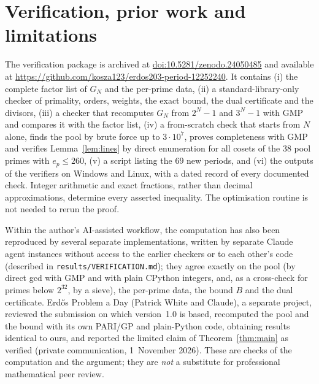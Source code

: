 \documentclass[11pt,a4paper]{article}
\begin{document}
\section{Verification, prior work and limitations}\label{sec:verif}
The verification package is archived at \href{https://doi.org/10.5281/zenodo.24050485}{doi:10.5281/zenodo.24050485} and available at \url{https://github.com/kosza123/erdos203-period-12252240}. It contains (i) the complete factor list of $G_N$ and the per-prime data, (ii) a standard-library-only checker of primality, orders, weights, the exact bound, the dual certificate and the divisors, (iii) a checker that recomputes $G_N$ from $2^N-1$ and $3^N-1$ with GMP and compares it with the factor list, (iv) a from-scratch check that starts from $N$ alone, finds the pool by brute force up to $3\cdot10^7$, proves completeness with GMP and verifies Lemma~\ref{lem:lines} by direct enumeration for all cosets of the $38$ pool primes with $e_p\le260$, (v) a script listing the $69$ new periods, and (vi) the outputs of the verifiers on Windows and Linux, with a dated record of every documented check. Integer arithmetic and exact fractions, rather than decimal approximations, determine every asserted inequality. The optimisation routine is not needed to rerun the proof.

Within the author's AI-assisted workflow, the computation has also been reproduced by several separate implementations, written by separate Claude agent instances without access to the earlier checkers or to each other's code (described in \texttt{results/VERIFICATION.md}); they agree exactly on the pool (by direct gcd with GMP and with plain CPython integers, and, as a cross-check for primes below $2^{32}$, by a sieve), the per-prime data, the bound $B$ and the dual certificate. Erd\H{o}s Problem a Day (Patrick White and Claude), a separate project, reviewed the submission on which version~1.0 is based, recomputed the pool and the bound with its own PARI/GP and plain-Python code, obtaining results identical to ours, and reported the limited claim of Theorem~\ref{thm:main} as verified (private communication, 1~November 2026). These are checks of the computation and the argument; they are \emph{not} a substitute for professional mathematical peer review.
\end{document}
